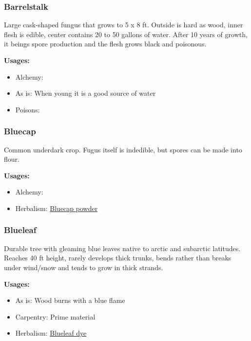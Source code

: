 \subsubsection{Barrelstalk}
\label{Barrelstalk}

Large cask-shaped fungus that grows to 5 x 8 ft. Outside is hard as wood, inner flesh is edible, center contains 20 to 50 gallons of water. After 10 years of growth, it beings spore production and the flesh grows black and poisonous.

\vspace{5mm}

\textbf{Usages:}

\begin{itemize}[noitemsep]
\item[] Alchemy: \earth\water\water
\item[] As is: When young it is a good source of water
\item[] Poisons: \poison
\end{itemize}

\subsubsection{Bluecap}
\label{Bluecap}

Common underdark crop. Fugus itself is indedible, but spores can be made into flour.

\vspace{5mm}

\textbf{Usages:}

\begin{itemize}[noitemsep]
\item[] Alchemy: \earth
\item[] Herbalism: \hyperref[Bluecap powder]{Bluecap powder}
\end{itemize}

\subsubsection{Blueleaf}
\label{Blueleaf}

Durable tree with gleaming blue leaves native to arctic and subarctic latitudes. Reaches 40 ft height, rarely develops thick trunks, bends rather than breaks under wind/snow and tends to grow in thick strands.

\vspace{5mm}

\textbf{Usages:}

\begin{itemize}[noitemsep]
\item[] As is: Wood burns with a blue flame
\item[] Carpentry: Prime material
\item[] Herbalism: \hyperref[Blueleaf dye]{Blueleaf dye}
\end{itemize}


